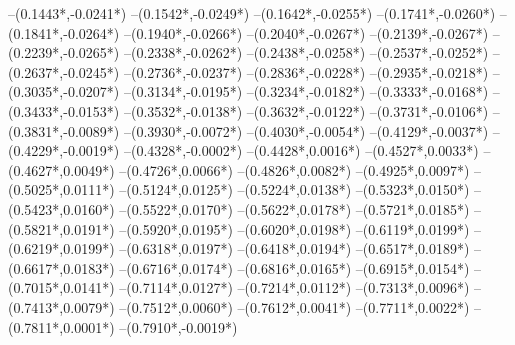 {	--({0.1443*\xskala},{-0.0241*\yskala})
	--({0.1542*\xskala},{-0.0249*\yskala})
	--({0.1642*\xskala},{-0.0255*\yskala})
	--({0.1741*\xskala},{-0.0260*\yskala})
	--({0.1841*\xskala},{-0.0264*\yskala})
	--({0.1940*\xskala},{-0.0266*\yskala})
	--({0.2040*\xskala},{-0.0267*\yskala})
	--({0.2139*\xskala},{-0.0267*\yskala})
	--({0.2239*\xskala},{-0.0265*\yskala})
	--({0.2338*\xskala},{-0.0262*\yskala})
	--({0.2438*\xskala},{-0.0258*\yskala})
	--({0.2537*\xskala},{-0.0252*\yskala})
	--({0.2637*\xskala},{-0.0245*\yskala})
	--({0.2736*\xskala},{-0.0237*\yskala})
	--({0.2836*\xskala},{-0.0228*\yskala})
	--({0.2935*\xskala},{-0.0218*\yskala})
	--({0.3035*\xskala},{-0.0207*\yskala})
	--({0.3134*\xskala},{-0.0195*\yskala})
	--({0.3234*\xskala},{-0.0182*\yskala})
	--({0.3333*\xskala},{-0.0168*\yskala})
	--({0.3433*\xskala},{-0.0153*\yskala})
	--({0.3532*\xskala},{-0.0138*\yskala})
	--({0.3632*\xskala},{-0.0122*\yskala})
	--({0.3731*\xskala},{-0.0106*\yskala})
	--({0.3831*\xskala},{-0.0089*\yskala})
	--({0.3930*\xskala},{-0.0072*\yskala})
	--({0.4030*\xskala},{-0.0054*\yskala})
	--({0.4129*\xskala},{-0.0037*\yskala})
	--({0.4229*\xskala},{-0.0019*\yskala})
	--({0.4328*\xskala},{-0.0002*\yskala})
	--({0.4428*\xskala},{0.0016*\yskala})
	--({0.4527*\xskala},{0.0033*\yskala})
	--({0.4627*\xskala},{0.0049*\yskala})
	--({0.4726*\xskala},{0.0066*\yskala})
	--({0.4826*\xskala},{0.0082*\yskala})
	--({0.4925*\xskala},{0.0097*\yskala})
	--({0.5025*\xskala},{0.0111*\yskala})
	--({0.5124*\xskala},{0.0125*\yskala})
	--({0.5224*\xskala},{0.0138*\yskala})
	--({0.5323*\xskala},{0.0150*\yskala})
	--({0.5423*\xskala},{0.0160*\yskala})
	--({0.5522*\xskala},{0.0170*\yskala})
	--({0.5622*\xskala},{0.0178*\yskala})
	--({0.5721*\xskala},{0.0185*\yskala})
	--({0.5821*\xskala},{0.0191*\yskala})
	--({0.5920*\xskala},{0.0195*\yskala})
	--({0.6020*\xskala},{0.0198*\yskala})
	--({0.6119*\xskala},{0.0199*\yskala})
	--({0.6219*\xskala},{0.0199*\yskala})
	--({0.6318*\xskala},{0.0197*\yskala})
	--({0.6418*\xskala},{0.0194*\yskala})
	--({0.6517*\xskala},{0.0189*\yskala})
	--({0.6617*\xskala},{0.0183*\yskala})
	--({0.6716*\xskala},{0.0174*\yskala})
	--({0.6816*\xskala},{0.0165*\yskala})
	--({0.6915*\xskala},{0.0154*\yskala})
	--({0.7015*\xskala},{0.0141*\yskala})
	--({0.7114*\xskala},{0.0127*\yskala})
	--({0.7214*\xskala},{0.0112*\yskala})
	--({0.7313*\xskala},{0.0096*\yskala})
	--({0.7413*\xskala},{0.0079*\yskala})
	--({0.7512*\xskala},{0.0060*\yskala})
	--({0.7612*\xskala},{0.0041*\yskala})
	--({0.7711*\xskala},{0.0022*\yskala})
	--({0.7811*\xskala},{0.0001*\yskala})
	--({0.7910*\xskala},{-0.0019*\yskala})
}

